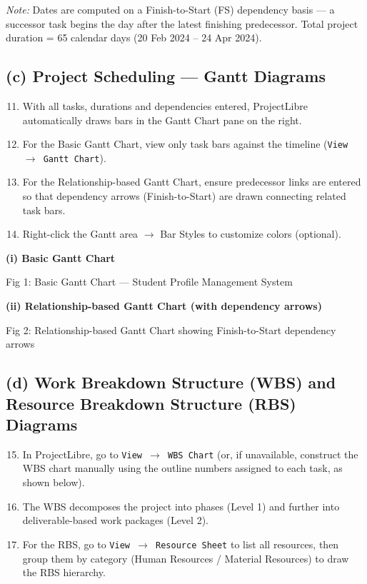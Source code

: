 \documentclass[10pt,a4paper]{article}
\begin{document}
\noindent\textit{Note:} Dates are computed on a Finish-to-Start (FS) dependency basis --- a successor task begins the day after the latest finishing predecessor. Total project duration = 65 calendar days (20 Feb 2024 -- 24 Apr 2024).

\subsection*{(c) Project Scheduling --- Gantt Diagrams}

\begin{enumerate}[nosep]
    \setcounter{enumi}{10}
    \item With all tasks, durations and dependencies entered, ProjectLibre automatically draws bars in the Gantt Chart pane on the right.
    \item For the Basic Gantt Chart, view only task bars against the timeline (\texttt{View $\to$ Gantt Chart}).
    \item For the Relationship-based Gantt Chart, ensure predecessor links are entered so that dependency arrows (Finish-to-Start) are drawn connecting related task bars.
    \item Right-click the Gantt area $\to$ Bar Styles to customize colors (optional).
\end{enumerate}

\noindent\textbf{(i) Basic Gantt Chart}

Fig 1: Basic Gantt Chart --- Student Profile Management System

\vspace{0.3cm}
\noindent\textbf{(ii) Relationship-based Gantt Chart (with dependency arrows)}

Fig 2: Relationship-based Gantt Chart showing Finish-to-Start dependency arrows

\subsection*{(d) Work Breakdown Structure (WBS) and Resource Breakdown Structure (RBS) Diagrams}

\begin{enumerate}[nosep]
    \setcounter{enumi}{14}
    \item In ProjectLibre, go to \texttt{View $\to$ WBS Chart} (or, if unavailable, construct the WBS chart manually using the outline numbers assigned to each task, as shown below).
    \item The WBS decomposes the project into phases (Level 1) and further into deliverable-based work packages (Level 2).
    \item For the RBS, go to \texttt{View $\to$ Resource Sheet} to list all resources, then group them by category (Human Resources / Material Resources) to draw the RBS hierarchy.
\end{enumerate}
\end{document}
